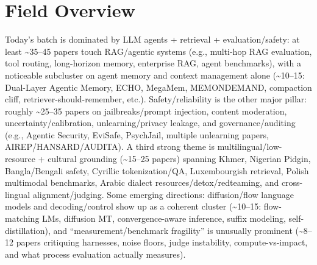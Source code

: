 \documentclass[12pt,letterpaper]{article}
\begin{document}
\medskip



\section*{Field Overview}
{\footnotesize Today's batch is dominated by LLM agents + retrieval + evaluation/safety: at least \textasciitilde{}35--45 papers touch RAG/agentic systems (e.g., multi-hop RAG evaluation, tool routing, long-horizon memory, enterprise RAG, agent benchmarks), with a noticeable subcluster on agent memory and context management alone (\textasciitilde{}10--15: Dual-Layer Agentic Memory, ECHO, MegaMem, MEMONDEMAND, compaction cliff, retriever-should-remember, etc.). Safety/reliability is the other major pillar: roughly \textasciitilde{}25--35 papers on jailbreaks/prompt injection, content moderation, uncertainty/calibration, unlearning/privacy leakage, and governance/auditing (e.g., Agentic Security, EviSafe, PsychJail, multiple unlearning papers, AIREP/HANSARD/AUDITA). A third strong theme is multilingual/low-resource + cultural grounding (\textasciitilde{}15--25 papers) spanning Khmer, Nigerian Pidgin, Bangla/Bengali safety, Cyrillic tokenization/QA, Luxembourgish retrieval, Polish multimodal benchmarks, Arabic dialect resources/detox/redteaming, and cross-lingual alignment/judging. Some emerging directions: diffusion/flow language models and decoding/control show up as a coherent cluster (\textasciitilde{}10--15: flow-matching LMs, diffusion MT, convergence-aware inference, suffix modeling, self-distillation), and ``measurement/benchmark fragility'' is unusually prominent (\textasciitilde{}8--12 papers critiquing harnesses, noise floors, judge instability, compute-vs-impact, and what process evaluation actually measures).}
\end{document}
